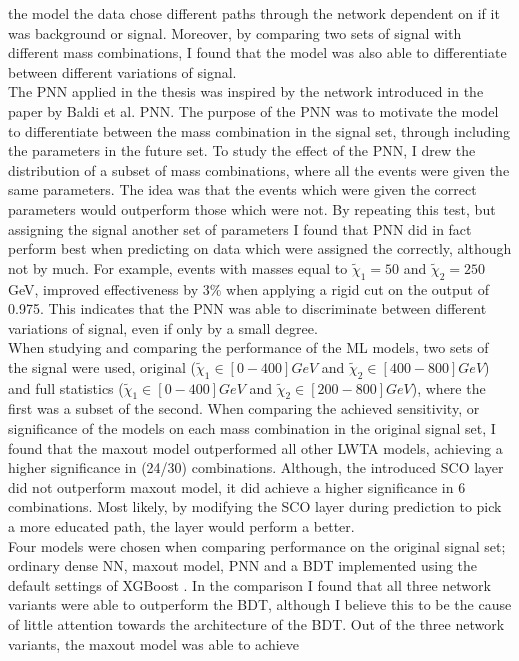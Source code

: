 the model the data chose different paths through the network dependent on if it was background or signal. Moreover, by comparing two sets of signal with different mass combinations, I found that the model 
was also able to differentiate between different variations of signal. 
\\
The \ac{PNN} applied in the thesis was inspired by the network introduced in the paper by  Baldi et al. \ac{PNN}. The purpose of the \ac{PNN} was to motivate the model to differentiate between the mass combination 
in the signal set, through including the parameters in the future set. To study the effect of the \ac{PNN}, I drew the distribution of a subset of mass combinations, where all the events were given the same parameters.
The idea was that the events which were given the correct parameters would outperform those which were not. By repeating this test, but assigning the signal another set of parameters I found that \ac{PNN} did in fact 
perform best when predicting on data which were assigned the correctly, although not by much. For example, events with masses equal to $\tilde{\chi}_1=50$ and  $\tilde{\chi}_2=250$GeV, improved effectiveness by $3\%$ when 
applying a rigid cut on the output of 0.975. This indicates that the \ac{PNN} was able to discriminate between different variations of signal, even if only by a small degree.
\\
When studying and comparing the performance of the \ac{ML} models, two sets of the signal were used, original ($\tilde{\chi}_1\in[0-400]GeV$ and  $\tilde{\chi}_2\in[400-800]GeV$) and full statistics ($\tilde{\chi}_1\in[0-400]GeV$ 
and  $\tilde{\chi}_2\in[200-800]GeV$), where the first was a subset of the second. When comparing the achieved sensitivity, or significance of the models on each mass combination in the original signal set, I found that the 
maxout model outperformed all other \ac{LWTA} models, achieving a higher significance in (24/30) combinations. Although, the introduced \ac{SCO} layer did not outperform maxout model, it did achieve a higher significance in 6 
combinations. Most likely, by modifying the \ac{SCO} layer during prediction to pick a more educated path, the layer would perform a better.
\\
Four models were chosen when comparing performance on the original signal set; ordinary dense \ac{NN}, maxout model, \ac{PNN} and a \ac{BDT} implemented using the default settings of XGBoost \cite{XGB}. In the comparison I found that 
all three network variants were able to outperform the \ac{BDT}, although I believe this to be the cause of little attention towards the architecture of the \ac{BDT}. Out of the three network variants, the maxout model was able to achieve 
